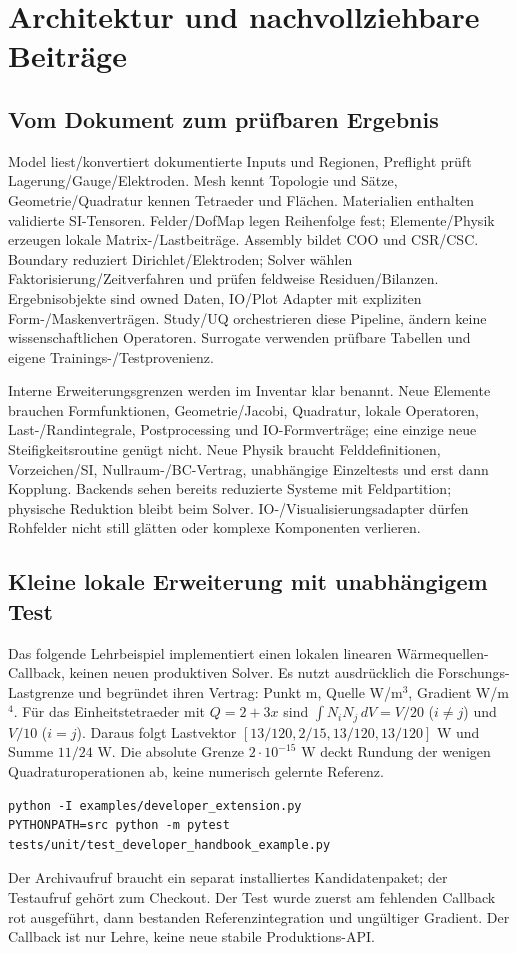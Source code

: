 \chapter{Architektur und nachvollziehbare Beiträge}
\label{api:development}
\begingroup\raggedright
\section{Vom Dokument zum prüfbaren Ergebnis}
Model liest/konvertiert dokumentierte Inputs und Regionen, Preflight prüft
Lagerung/Gauge/Elektroden. Mesh kennt Topologie und Sätze, Geometrie/Quadratur
kennen Tetraeder und Flächen. Materialien enthalten validierte SI-Tensoren.
Felder/DofMap legen Reihenfolge fest; Elemente/Physik erzeugen lokale
Matrix-/Lastbeiträge. Assembly bildet COO und CSR/CSC. Boundary reduziert
Dirichlet/Elektroden; Solver wählen Faktorisierung/Zeitverfahren und prüfen
feldweise Residuen/Bilanzen. Ergebnisobjekte sind owned Daten, IO/Plot
Adapter mit expliziten Form-/Maskenverträgen. Study/UQ orchestrieren diese
Pipeline, ändern keine wissenschaftlichen Operatoren. Surrogate verwenden
prüfbare Tabellen und eigene Trainings-/Testprovenienz.

Interne Erweiterungsgrenzen werden im Inventar klar benannt. Neue Elemente
brauchen Formfunktionen, Geometrie/Jacobi, Quadratur, lokale Operatoren,
Last-/Randintegrale, Postprocessing und IO-Formverträge; eine einzige neue
Steifigkeitsroutine genügt nicht. Neue Physik braucht Felddefinitionen,
Vorzeichen/SI, Nullraum-/BC-Vertrag, unabhängige Einzeltests und erst dann
Kopplung. Backends sehen bereits reduzierte Systeme mit Feldpartition;
physische Reduktion bleibt beim Solver. IO-/Visualisierungsadapter dürfen
Rohfelder nicht still glätten oder komplexe Komponenten verlieren.

\section{Kleine lokale Erweiterung mit unabhängigem Test}
Das folgende Lehrbeispiel implementiert einen lokalen linearen Wärmequellen-
Callback, keinen neuen produktiven Solver. Es nutzt ausdrücklich die
Forschungs-Lastgrenze und begründet ihren Vertrag: Punkt m, Quelle W/m$^3$,
Gradient W/m$^4$. Für das Einheitstetraeder mit $Q=2+3x$ sind
$\int N_iN_j\,dV=V/20$ ($i\ne j$) und $V/10$ ($i=j$).
Daraus folgt Lastvektor $[13/120,2/15,13/120,13/120]$ W und Summe $11/24$ W.
Die absolute Grenze $2\cdot10^{-15}$ W deckt Rundung der wenigen
Quadraturoperationen ab, keine numerisch gelernte Referenz.

\begin{lstlisting}
python -I examples/developer_extension.py
PYTHONPATH=src python -m pytest tests/unit/test_developer_handbook_example.py
\end{lstlisting}
Der Archivaufruf braucht ein separat installiertes Kandidatenpaket; der
Testaufruf gehört zum Checkout. Der Test wurde zuerst am fehlenden Callback
rot ausgeführt, dann bestanden Referenzintegration und ungültiger Gradient.
Der Callback ist nur Lehre, keine neue stabile Produktions-API.

